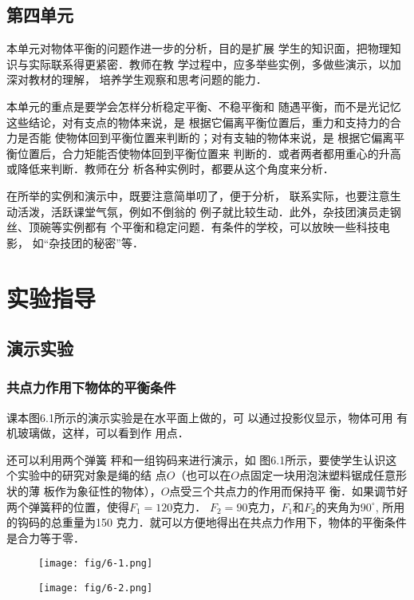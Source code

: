 \subsection{第四单元}
本单元对物体平衡的问题作进一步的分析，目的是扩展
学生的知识面，把物理知识与实际联系得更紧密．教师在教
学过程中，应多举些实例，多做些演示，以加深对教材的理解，
培养学生观察和思考问题的能力．

本单元的重点是要学会怎样分析稳定平衡、不稳平衡和
随遇平衡，而不是光记忆这些结论，对有支点的物体来说，是
根据它偏离平衡位置后，重力和支持力的合力是否能
使物体回到平衡位置来判断的；对有支轴的物体来说，是
根据它偏离平衡位置后，合力矩能否使物体回到平衡位置来
判断的．或者两者都用重心的升高或降低来判断．教师在分
析各种实例时，都要从这个角度来分析．

在所举的实例和演示中，既要注意简単叨了，便于分析，
联系实际，也要注意生动活泼，活跃课堂气氛，例如不倒翁的
例子就比较生动．此外，杂技团演员走钢丝、顶碗等实例都有
个平衡和稳定问题．有条件的学校，可以放映一些科技电影，
如“杂技团的秘密”等．

\section{实验指导}
\subsection{演示实验}
\subsubsection{共点力作用下物体的平衡条件}
课本图6.1所示的演示实验是在水平面上做的，可
以通过投影仪显示，物体可用
有机玻璃做，这样，可以看到作
用点．


还可以利用两个弹簧
秤和一组钩码来进行演示，如
图6.1所示，要使学生认识这
个实验中的研究对象是绳的结
点$O$（也可以在$O$点固定一块用泡沫塑料锯成任意形状的薄
板作为象征性的物体），$O$点受三个共点力的作用而保持平
衡．如果调节好两个弹簧秤的位置，使得$F_1=120$克力．
$F_2=90$克力，$F_1$和$F_2$的夹角为$90^{\circ}$, 所用的钩码的总重量为150
克力．就可以方便地得出在共点力作用下，物体的平衡条件
是合力等于零．

\begin{figure}[htp]\centering
    \begin{minipage}[t]{0.48\textwidth}
    \centering
    \texttt{[image: fig/6-1.png]}
    \caption{}
    \end{minipage}
    \begin{minipage}[t]{0.48\textwidth}
    \centering
    \texttt{[image: fig/6-2.png]}
    \caption{}
    \end{minipage}
    \end{figure}

